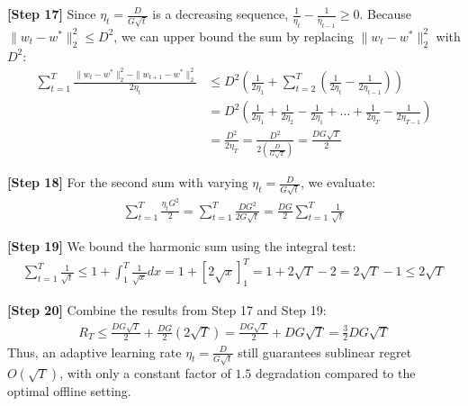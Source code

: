 \documentclass{article}
\begin{document}
\textbf{[Step 17]} Since $\eta_t = \frac{D}{G\sqrt{t}}$ is a decreasing sequence, $\frac{1}{\eta_t} - \frac{1}{\eta_{t-1}} \geq 0$. Because $\|w_t - w^*\|_2^2 \leq D^2$, we can upper bound the sum by replacing $\|w_t - w^*\|_2^2$ with $D^2$:
\begin{align*}
\sum_{t=1}^T \frac{\|w_t - w^*\|_2^2 - \|w_{t+1} - w^*\|_2^2}{2\eta_t} &\leq D^2 \left( \frac{1}{2\eta_1} + \sum_{t=2}^T \left( \frac{1}{2\eta_t} - \frac{1}{2\eta_{t-1}} \right) \right) \\
&= D^2 \left( \frac{1}{2\eta_1} + \frac{1}{2\eta_2} - \frac{1}{2\eta_1} + \dots + \frac{1}{2\eta_T} - \frac{1}{2\eta_{T-1}} \right) \\
&= \frac{D^2}{2\eta_T} = \frac{D^2}{2 \left(\frac{D}{G\sqrt{T}}\right)} = \frac{DG\sqrt{T}}{2}
\end{align*}

\textbf{[Step 18]} For the second sum with varying $\eta_t = \frac{D}{G\sqrt{t}}$, we evaluate:
\begin{align*}
\sum_{t=1}^T \frac{\eta_t G^2}{2} = \sum_{t=1}^T \frac{D G^2}{2 G \sqrt{t}} = \frac{DG}{2} \sum_{t=1}^T \frac{1}{\sqrt{t}}
\end{align*}

\textbf{[Step 19]} We bound the harmonic sum using the integral test:
\begin{align*}
\sum_{t=1}^T \frac{1}{\sqrt{t}} \leq 1 + \int_1^T \frac{1}{\sqrt{x}} dx = 1 + \left[ 2\sqrt{x} \right]_1^T = 1 + 2\sqrt{T} - 2 = 2\sqrt{T} - 1 \leq 2\sqrt{T}
\end{align*}

\textbf{[Step 20]} Combine the results from Step 17 and Step 19:
\begin{align*}
R_T \leq \frac{DG\sqrt{T}}{2} + \frac{DG}{2} (2\sqrt{T}) = \frac{DG\sqrt{T}}{2} + DG\sqrt{T} = \frac{3}{2} DG\sqrt{T}
\end{align*}
Thus, an adaptive learning rate $\eta_t = \frac{D}{G\sqrt{t}}$ still guarantees sublinear regret $O(\sqrt{T})$, with only a constant factor of $1.5$ degradation compared to the optimal offline setting.
\end{document}
